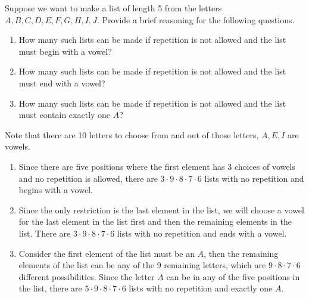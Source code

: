 \documentclass{article}
\theoremstyle{definition}
\begin{document}
\begin{question}
    Suppose we want to make a list of length 5 from the letters $A, B, C, D, E, F, G, H, I, J$. Provide a brief reasoning for the following questions.
        \begin{enumerate}
            \item How many such lists can be made if repetition is not allowed and the list must begin with a vowel?
            \item How many such lists can be made if repetition is not allowed and the list must end with a vowel?
            \item How many such lists can be made if repetition is not allowed and the list must contain exactly one $A$?
        \end{enumerate}
\end{question}
\begin{solution}
Note that there are 10 letters to choose from and out of those letters, $A, E, I$ are vowels.
    \begin{enumerate}
        \item Since there are five positions where the first element has 3 choices of vowels and no repetition is allowed, there are $3\cdot 9 \cdot 8\cdot 7\cdot 6$ lists with no repetition and begins with a vowel. 
        \item Since the only restriction is the last element in the list, we will choose a vowel for the last element in the list first and then the remaining elements in the list. There are $3\cdot 9 \cdot 8\cdot 7\cdot 6$ lists with no repetition and ends with a vowel. 
        \item Consider the first element of the list must be an $A$, then the remaining elements of the list can be any of the 9 remaining letters, which are $9 \cdot 8\cdot 7\cdot 6$ different possibilities. Since the letter $A$ can be in any of the five positions in the list, there are $5\cdot 9 \cdot 8\cdot 7\cdot 6$ lists with no repetition and exactly one $A$.
    \end{enumerate}
\end{solution}
\end{document}
